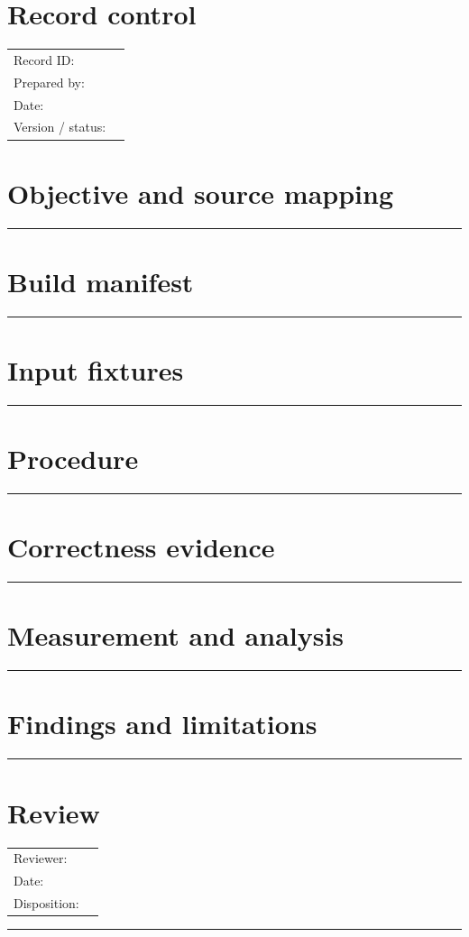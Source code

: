 \documentclass[11pt]{article}
\begin{document}
\makedoctitle
\section{Record control}
\begin{tabularx}{\linewidth}{@{}lX@{}}Record ID: & \hrulefill \\ Prepared by: & \hrulefill \\ Date: & \hrulefill \\ Version / status: & \hrulefill \\\end{tabularx}
\section{Objective and source mapping}
\vspace{1.75cm}\hrule\vspace{0.35cm}
\section{Build manifest}
\vspace{1.75cm}\hrule\vspace{0.35cm}
\section{Input fixtures}
\vspace{1.75cm}\hrule\vspace{0.35cm}
\section{Procedure}
\vspace{1.75cm}\hrule\vspace{0.35cm}
\section{Correctness evidence}
\vspace{1.75cm}\hrule\vspace{0.35cm}
\section{Measurement and analysis}
\vspace{1.75cm}\hrule\vspace{0.35cm}
\section{Findings and limitations}
\vspace{1.75cm}\hrule\vspace{0.35cm}
\section{Review}\begin{tabularx}{\linewidth}{@{}lX@{}}Reviewer: & \hrulefill \\ Date: & \hrulefill \\ Disposition: & \hrulefill \\\end{tabularx}\vspace{0.9cm}\hrule
\end{document}
